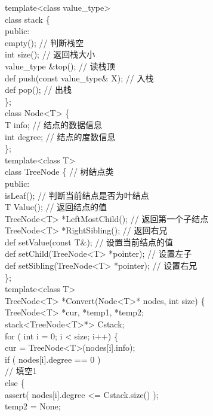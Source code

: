 \begin{question}
template<class value\_type>\\
class stack \{\\
public:\\
empty();                        // 判断栈空\\
int size();                          // 返回栈大小\\
value\_type \&top();                  // 读栈顶\\
def push(const value\_type\& X);  // 入栈\\
def pop();                          // 出栈\\
\};\\
class Node<T> \{\\
T info;                               // 结点的数据信息\\
int degree;                          // 结点的度数信息\\
\};\\
template<class T>\\
class TreeNode \{                         // 树结点类\\
public:\\
isLeaf();                       // 判断当前结点是否为叶结点\\
T Value();                            // 返回结点的值\\
TreeNode<T> *LeftMostChild();     // 返回第一个子结点\\
TreeNode<T> *RightSibling();      // 返回右兄\\
def setValue(const T\&);           // 设置当前结点的值\\
def setChild(TreeNode<T> *pointer);    // 设置左子\\
def setSibling(TreeNode<T> *pointer);  // 设置右兄\\
\};\\
template<class T>\\
TreeNode<T> *Convert(Node<T>* nodes, int size) \{\\
TreeNode<T> *cur, *temp1, *temp2;\\
stack<TreeNode<T>*> Cstack;\\
for ( int i = 0; i < size; i++) \{\\
cur = TreeNode<T>(nodes[i].info);\\
if ( nodes[i].degree == 0 )\\
// 填空1\\
else \{\\
assert( nodes[i].degree <= Cstack.size() );\\
temp2 = None;\\

\end{question}
